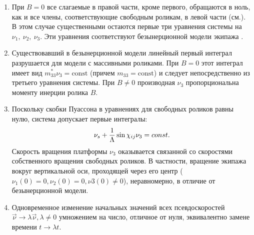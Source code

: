\begin{enumerate}
    \item При $B = 0$ все слагаемые в правой части, кроме первого, обращаются в ноль, как и все члены, соответствующие свободным роликам, в левой части (см.). В этом случае существенными остаются первые три уравнения системы на $\nu_1,\ \nu_2,\ \nu_3$. Эти уравнения соответствуют безынерционной модели экипажа \cite{ZobovaTatarinovPMM}.
    \item Существовавший в безынерционной модели линейный первый интеграл разрушается для модели с массивными роликами. При $B = 0$ этот интеграл имеет вид $m_{33}^*\nu_3 = \mathrm{const}$ (причем $m_{33} = \mathrm{const}$) и следует непосредственно из третьего уравнения системы. При $B\neq 0$ производная $\nu_3$ пропорциональна моменту инерции ролика $B$.
    \item Поскольку скобки Пуассона в уравнениях для свободных роликов равны нулю, система допускает первые интегралы:
    $$\nu_s + \displaystyle\frac{\displaystyle 1}{\displaystyle \Lambda}\sin\chi_{ij}\nu_3 = const.$$
    Скорость вращения платформы $\nu_3$ оказывается связанной со скоростями собственного вращения свободных роликов. В частности, вращение экипажа вокруг вертикальной оси, проходящей через его центр ($\nu_1(0) = 0, \nu_2(0) = 0, \nu3(0) \neq 0$), неравномерно, в отличие от безынерционной модели.
    \item Одновременное изменение начальных значений всех псевдоскоростей $\vec{\nu} \rightarrow \lambda\vec{\nu}, \lambda \neq 0$ умножением на число, отличное от нуля, эквивалентно замене времени $t \rightarrow \lambda t$.
\end{enumerate}

